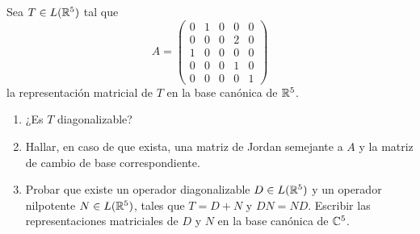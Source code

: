 \item Sea $T\in L(\mathbb{R}^5)$ tal que \[A=\begin{pmatrix}
        0&1&0&0&0\\0&0&0&2&0\\1&0&0&0&0\\0&0&0&1&0\\0&0&0&0&1
    \end{pmatrix}\]
    la representación matricial de $T$ en la base canónica de $\mathbb{R}^5$.
    \begin{enumerate}
        \item ¿Es $T$ diagonalizable?
            \begin{mdframed}[style=s]
                
            \end{mdframed}
        \item Hallar, en caso de que exista, una matriz de Jordan semejante a $A$ y la matriz de cambio de base correspondiente.
            \begin{mdframed}[style=s]
                
            \end{mdframed}
        \item Probar que existe un operador diagonalizable $D\in L(\mathbb{R}^5)$ y un operador nilpotente $N\in L(\mathbb{R}^5)$, tales que $T=D+N$ y $DN=ND$. Escribir las representaciones matriciales de $D$ y $N$ en la base canónica de $\mathbb{C}^5$.
            \begin{mdframed}[style=s]
                
            \end{mdframed}
    \end{enumerate}